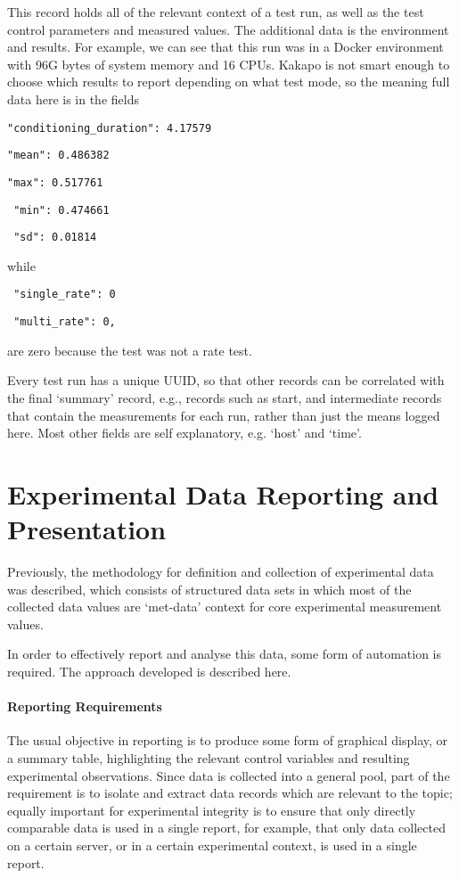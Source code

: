This record holds all of the relevant context of a test run, as well as the test control parameters and measured values.
The additional data is the environment and results.
For example, we can see that this run was in a Docker environment with 96G bytes of system memory and 16 CPUs.
Kakapo is not smart enough to choose which results to report depending on what test mode, so the meaning full data here is in the fields

\verb|"conditioning_duration": 4.17579|

\verb|"mean": 0.486382|

\verb|"max": 0.517761|

\verb| "min": 0.474661|

\verb| "sd": 0.01814|

 while
 
 \verb| "single_rate": 0|
 
 \verb| "multi_rate": 0,|
 
 are zero because the test was not a rate test.

 Every test run has a unique UUID, so that other records can be correlated with the final `summary' record, e.g., records such as start, and intermediate records that contain the measurements for each run, rather than just the means logged here.  Most other fields are self explanatory, e.g. `host' and `time'.


\section{Experimental Data Reporting and Presentation}

Previously, the methodology for definition and collection of experimental data was described, which consists of structured data sets in which most of the collected data values are `met-data' context for core experimental measurement values.

In order to effectively report and analyse this data, some form of automation is required.
The approach developed is described here.

\paragraph{Reporting Requirements}
The usual objective in reporting is to produce some form of graphical display, or a summary table, highlighting the relevant control variables and resulting experimental observations.
Since data is collected into a general pool, part of the requirement is to isolate and extract data records which are relevant to the topic; equally important for experimental integrity is to ensure that only directly comparable data is used in a single report, for example, that only data collected on a certain server, or in a certain experimental context, is used in a single report.


